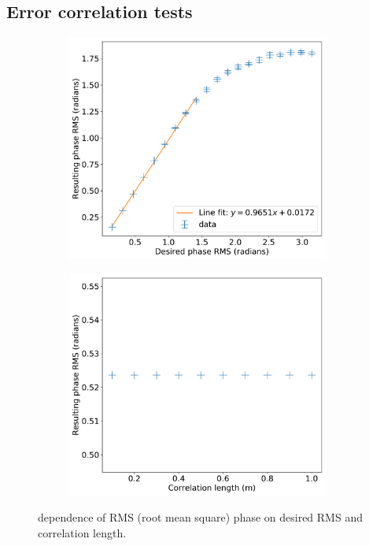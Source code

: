 \documentclass{article}
\begin{document}
\subsection{Error correlation tests}\label{sec:res:rms}
\begin{figure}
    \centering
    \begin{subfigure}{0.5\textwidth}
        \centering
        \includegraphics[width=0.95\textwidth]{pictures/rmstest/depth}
        \caption{}\label{fig:rms:depth}
    \end{subfigure}%
    \begin{subfigure}{0.5\textwidth}
        \centering
        \includegraphics[width=0.95\textwidth]{pictures/rmstest/l_corr}
        \caption{}\label{fig:rms:length}
    \end{subfigure}
    \caption{dependence of RMS (root mean square) phase on desired RMS and correlation length.}\label{fig:rms}
\end{figure}
\end{document}
